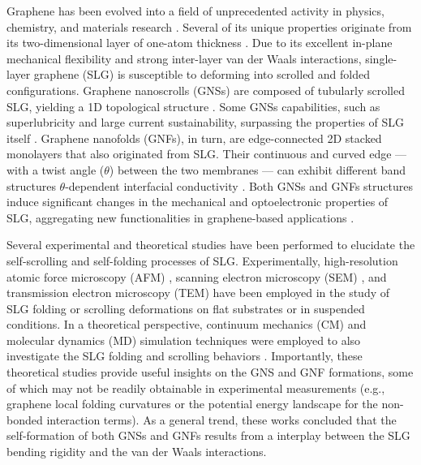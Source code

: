 \documentclass[twoside,twocolumn,9pt]{article}
\begin{document}
Graphene has been evolved into a field of unprecedented activity in physics, chemistry, and materials research \cite{zhu2010graphene}. Several of its unique properties originate from its two-dimensional layer of one-atom thickness \cite{neto2009electronic}. Due to its excellent in-plane mechanical flexibility and strong inter-layer van der Waals interactions, single-layer graphene (SLG) is susceptible to deforming into scrolled \cite{viculis2003chemical} and folded \cite{zhang2010free} configurations. Graphene nanoscrolls (GNSs) are composed of tubularly scrolled SLG, yielding a 1D topological structure \cite{braga2004structure,toma1993stability,lavin2002scrolls,tomanek2002mesoscopic}. Some GNSs capabilities, such as superlubricity and large current sustainability, surpassing the properties of SLG itself \cite{li2018superior}. Graphene nanofolds (GNFs), in turn, are edge-connected 2D stacked monolayers that also originated from SLG. Their continuous and curved edge --- with a twist angle ($\theta$) between the two membranes --- can exhibit different band structures $\theta$-dependent interfacial conductivity \cite{wang2017controlled}. Both GNSs and GNFs structures induce significant changes in the mechanical and optoelectronic properties of SLG, aggregating new functionalities in graphene-based applications \cite{lima2011biscrolling,cranford2009meso,berman2015macroscale,patra2009nanodroplet,pereirajrPCCP_2020,tromer_PE}. 

Several experimental and theoretical studies have been performed to elucidate the self-scrolling \cite{berman2015macroscale,braga2004structure,shi2010mechanics,shi2010translational,xia2010fabrication,chu2011fabrication} and self-folding \cite{chen2014graphene,wang2017controlled,kim2011multiply,meng2013mechanics,mu2015origami,shenoy2012self} processes of SLG. Experimentally, high-resolution atomic force microscopy (AFM) \cite{chen2014graphene,chen2012novel}, scanning electron microscopy (SEM) \cite{yoo2012graphene,zheng2016preparation}, and transmission electron microscopy (TEM) \cite{zhang2010free,berman2015macroscale} have been employed in the study of SLG folding or scrolling deformations on flat substrates or in suspended conditions. In a theoretical perspective, continuum mechanics (CM) and molecular dynamics (MD) simulation techniques were employed to also investigate the SLG folding and scrolling behaviors \cite{braga2004structure,bellido2010molecular,zheng2011mechanical,gao2020molecular,zhu2013hydrogenation,cranford2009meso}. Importantly, these theoretical studies provide useful insights on the GNS and GNF formations, some of which may not be readily obtainable in experimental measurements (e.g., graphene local folding curvatures or the potential energy landscape for the non-bonded interaction terms). As a general trend, these works concluded that the self-formation of both GNSs and GNFs results from a interplay between the SLG bending rigidity and the van der Waals interactions. 
\end{document}
